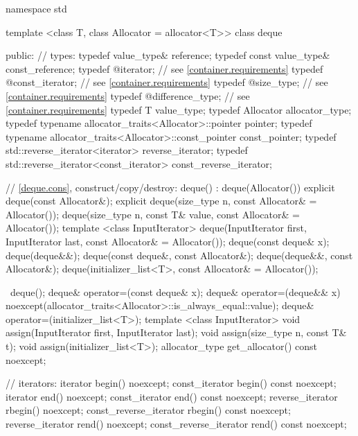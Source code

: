 \begin{codeblock}
namespace std {
  template <class T, class Allocator = allocator<T>>
  class deque {
  public:
    // types:
    typedef value_type&                                         reference;
    typedef const value_type&                                   const_reference;
    typedef @\impdefnc@                              iterator;        // see \ref{container.requirements}
    typedef @\impdefnc@                              const_iterator;  // see \ref{container.requirements}
    typedef @\impdefnc@                              size_type;       // see \ref{container.requirements}
    typedef @\impdefnc@                              difference_type; // see \ref{container.requirements}
    typedef T                                                   value_type;
    typedef Allocator                                           allocator_type;
    typedef typename allocator_traits<Allocator>::pointer       pointer;
    typedef typename allocator_traits<Allocator>::const_pointer const_pointer;
    typedef std::reverse_iterator<iterator>                     reverse_iterator;
    typedef std::reverse_iterator<const_iterator>               const_reverse_iterator;

    // \ref{deque.cons}, construct/copy/destroy:
    deque() : deque(Allocator()) { }
    explicit deque(const Allocator&);
    explicit deque(size_type n, const Allocator& = Allocator());
    deque(size_type n, const T& value, const Allocator& = Allocator());
    template <class InputIterator>
      deque(InputIterator first, InputIterator last, const Allocator& = Allocator());
    deque(const deque& x);
    deque(deque&&);
    deque(const deque&, const Allocator&);
    deque(deque&&, const Allocator&);
    deque(initializer_list<T>, const Allocator& = Allocator());

    ~deque();
    deque& operator=(const deque& x);
    deque& operator=(deque&& x)
      noexcept(allocator_traits<Allocator>::is_always_equal::value);
    deque& operator=(initializer_list<T>);
    template <class InputIterator>
      void assign(InputIterator first, InputIterator last);
    void assign(size_type n, const T& t);
    void assign(initializer_list<T>);
    allocator_type get_allocator() const noexcept;

    // iterators:
    iterator               begin() noexcept;
    const_iterator         begin() const noexcept;
    iterator               end() noexcept;
    const_iterator         end() const noexcept;
    reverse_iterator       rbegin() noexcept;
    const_reverse_iterator rbegin() const noexcept;
    reverse_iterator       rend() noexcept;
    const_reverse_iterator rend() const noexcept;

}}
\end{codeblock}
